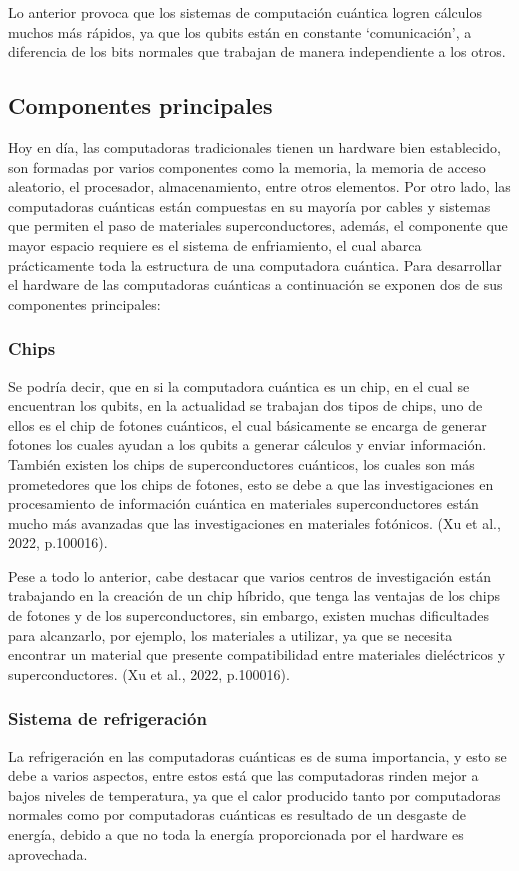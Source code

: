 \documentclass{article}
\begin{document}
Lo anterior provoca que los sistemas de computación cuántica logren cálculos muchos más rápidos, ya que los qubits están en constante ‘comunicación’, a diferencia de los bits normales que trabajan de manera independiente a los otros. 

\subsection{Componentes principales}
Hoy en día, las computadoras tradicionales tienen un hardware bien establecido, son formadas por varios componentes como la memoria, la memoria de acceso aleatorio, el procesador, almacenamiento, entre otros elementos.
Por otro lado, las computadoras cuánticas están compuestas en su mayoría por cables y sistemas que permiten el paso de materiales superconductores, además, el componente que mayor espacio requiere es el sistema de enfriamiento, el cual abarca prácticamente toda la estructura de una computadora cuántica. Para desarrollar el hardware de las computadoras cuánticas a continuación se exponen dos de sus componentes principales:

\subsubsection{Chips}
Se podría decir, que en si la computadora cuántica es un chip, en el cual se encuentran los qubits, en la actualidad se trabajan dos tipos de chips, uno de ellos es el chip de fotones cuánticos, el cual básicamente se encarga de generar fotones los cuales ayudan a los qubits a generar cálculos y enviar información. También existen los chips de superconductores cuánticos, los cuales son más prometedores que los chips de fotones, esto se debe a que las investigaciones en procesamiento de información cuántica en materiales superconductores están mucho más avanzadas que las investigaciones en materiales fotónicos. (Xu et al., 2022, p.100016).

Pese a todo lo anterior, cabe destacar que varios centros de investigación están trabajando en la creación de un chip híbrido, que tenga las ventajas de los chips de fotones y de los superconductores, sin embargo, existen muchas dificultades para alcanzarlo, por ejemplo, los materiales a utilizar, ya que se necesita encontrar un material que presente compatibilidad entre materiales dieléctricos y superconductores. (Xu et al., 2022, p.100016).

\subsubsection{Sistema de refrigeración}
La refrigeración en las computadoras cuánticas es de suma importancia, y esto se debe a varios aspectos, entre estos está que las computadoras rinden mejor a bajos niveles de temperatura, ya que el calor producido tanto por computadoras normales como por computadoras cuánticas es resultado de un desgaste de energía, debido a que no toda la energía proporcionada por el hardware es aprovechada.
 
\end{document}
